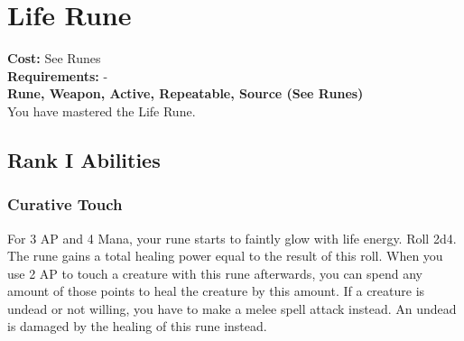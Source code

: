 \section{Life Rune}\label{rune:life}
\textbf{Cost:} See Runes\\
\textbf{Requirements:} -\\
\textbf{Rune, Weapon, Active, Repeatable, Source (See Runes)}\\
You have mastered the Life Rune.

\subsection{Rank I Abilities}

\subsubsection{Curative Touch}
For 3 AP and 4 Mana, your rune starts to faintly glow with life energy.
Roll 2d4.
The rune gains a total healing power equal to the result of this roll.
When you use 2 AP to touch a creature with this rune afterwards, you can spend any amount of those points to heal the creature by this amount.
If a creature is undead or not willing, you have to make a melee spell attack instead.
An undead is damaged by the healing of this rune instead.